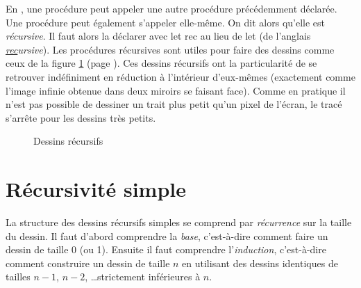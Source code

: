 En \ocaml, une procédure peut appeler une autre procédure précédemment 
déclarée. Une procédure peut également s'appeler elle-même. On dit
alors qu'elle est {\em récursive}. Il faut alors la déclarer avec
{\mcl let rec} au lieu de {\mcl let} (de l'anglais {\em \underline{rec}ursive}). Les procédures récursives sont utiles
pour faire des dessins comme ceux de la figure \ref{fig:desrec} (page
\pageref{fig:desrec}). Ces dessins récursifs ont la particularité de se
retrouver indéfiniment en réduction à l'intérieur d'eux-mêmes (exactement
comme l'image infinie obtenue dans deux miroirs se faisant face). Comme en pratique il n'est 
pas possible de dessiner un trait plus petit qu'un pixel de l'écran, le tracé s'arrête 
pour les dessins très petits.
\begin{figure}[htbp]
 \caption{Dessins récursifs}\label{fig:desrec}
\end{figure}

\section{Récursivité simple}

La structure des dessins récursifs simples se comprend par {\em récurrence} sur la taille du dessin.
Il faut d'abord comprendre la {\em base\/}, c'est-à-dire comment faire un dessin de taille 0 (ou 1). 
Ensuite il faut comprendre l'{\em induction\/}, c'est-à-dire 
comment construire un dessin de taille $n$ en utilisant des dessins identiques de tailles $n-1$, 
$n-2$, \ldots strictement inférieures à $n$.  

